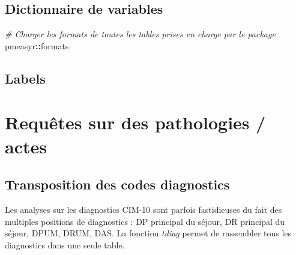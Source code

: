 \documentclass[]{book}
\newenvironment{Shaded}{\begin{snugshade}}{\end{snugshade}}
\newcommand{\KeywordTok}[1]{\textcolor[rgb]{0.13,0.29,0.53}{\textbf{#1}}}
\newcommand{\DataTypeTok}[1]{\textcolor[rgb]{0.13,0.29,0.53}{#1}}
\newcommand{\CommentTok}[1]{\textcolor[rgb]{0.56,0.35,0.01}{\textit{#1}}}
\newcommand{\OperatorTok}[1]{\textcolor[rgb]{0.81,0.36,0.00}{\textbf{#1}}}
\newcommand{\NormalTok}[1]{#1}
\begin{document}
\section{Dictionnaire de variables}\label{dictionnaire-de-variables}

\begin{Shaded}
\end{Shaded}

\begin{Shaded}
\begin{Highlighting}[]
\CommentTok{# Charger les formats de toutes les tables prises en charge par le package}
\NormalTok{pmeasyr}\OperatorTok{::}\NormalTok{formats}
\end{Highlighting}
\end{Shaded}

\section{Labels}\label{labels}

\begin{Shaded}
\end{Shaded}

\chapter{Requêtes sur des pathologies /
actes}\label{requetes-sur-des-pathologies-actes}

\section{Transposition des codes
diagnostics}\label{transposition-des-codes-diagnostics}

Les analyses sur les diagnostics CIM-10 sont parfois fastidieuses du
fait des multiples positions de diagnostics : DP principal du séjour, DR
principal du séjour, DPUM, DRUM, DAS. La fonction \emph{tdiag} permet de
rassembler tous les diagnostics dans une seule table.
\end{document}

